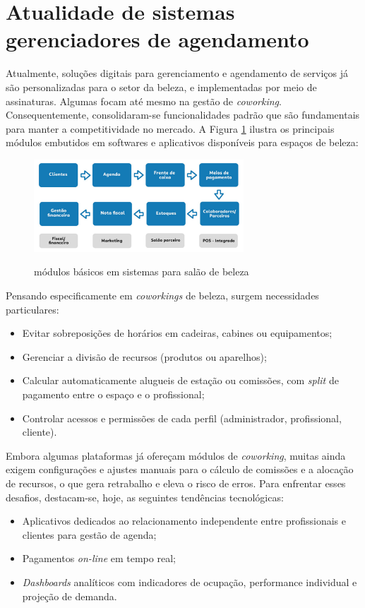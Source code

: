 \section{Atualidade de sistemas gerenciadores de agendamento}

Atualmente, soluções digitais para gerenciamento e agendamento de serviços já são personalizadas para o setor da beleza, e implementadas por meio de assinaturas. Algumas focam até mesmo na gestão de \emph{coworking}. Consequentemente, consolidaram-se funcionalidades padrão que são fundamentais para manter a competitividade no mercado. A Figura \ref{fig:modulos} ilustra os principais módulos embutidos em softwares e aplicativos disponíveis para espaços de beleza:

\begin{figure}[htb]
	\centering
	\caption{módulos básicos em sistemas para salão de beleza}
	\includegraphics[width=0.7\textwidth]{cap02-revisao/Images/modulos_basicos_sistema}
	\label{fig:modulos}
\end{figure}


Pensando especificamente em \emph{coworkings} de beleza, surgem necessidades particulares:
\begin{itemize}
	\item Evitar sobreposições de horários em cadeiras, cabines ou equipamentos;
	\item Gerenciar a divisão de recursos (produtos ou aparelhos);
	\item Calcular automaticamente alugueis de estação ou comissões, com \emph{split} de pagamento entre o espaço e o profissional;
	\item Controlar acessos e permissões de cada perfil (administrador, profissional, cliente).
\end{itemize}

Embora algumas plataformas já ofereçam módulos de \emph{coworking}, muitas ainda exigem configurações e ajustes manuais para o cálculo de comissões e a alocação de recursos, o que gera retrabalho e eleva o risco de erros. Para enfrentar esses desafios, destacam-se, hoje, as seguintes tendências tecnológicas:
\begin{itemize}
	\item Aplicativos dedicados ao relacionamento independente entre profissionais e clientes para gestão de agenda;
	\item Pagamentos \emph{on-line} em tempo real;
	\item \emph{Dashboards} analíticos com indicadores de ocupação, performance individual e projeção de demanda.
\end{itemize}

